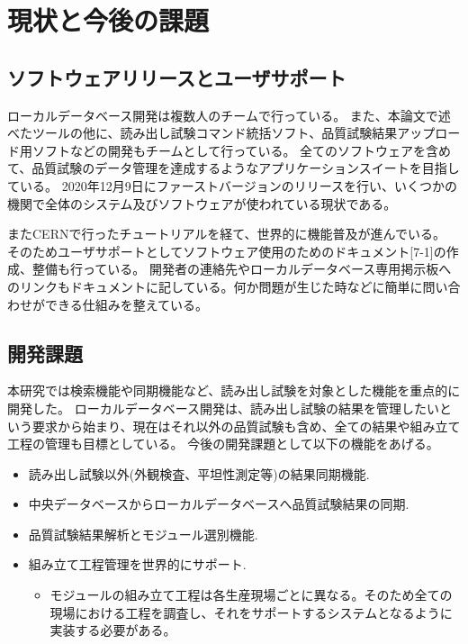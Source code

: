 \section{現状と今後の課題}
\subsection{ソフトウェアリリースとユーザサポート}
ローカルデータベース開発は複数人のチームで行っている。
また、本論文で述べたツールの他に、読み出し試験コマンド統括ソフト、品質試験結果アップロード用ソフトなどの開発もチームとして行っている。
全てのソフトウェアを含めて、品質試験のデータ管理を達成するようなアプリケーションスイートを目指している。
2020年12月9日にファーストバージョンのリリースを行い、いくつかの機関で全体のシステム及びソフトウェアが使われている現状である。

またCERNで行ったチュートリアルを経て、世界的に機能普及が進んでいる。
そのためユーザサポートとしてソフトウェア使用のためのドキュメント[7-1]の作成、整備も行っている。
開発者の連絡先やローカルデータベース専用掲示板へのリンクもドキュメントに記している。何か問題が生じた時などに簡単に問い合わせができる仕組みを整えている。

\subsection{開発課題}
本研究では検索機能や同期機能など、読み出し試験を対象とした機能を重点的に開発した。
ローカルデータベース開発は、読み出し試験の結果を管理したいという要求から始まり、現在はそれ以外の品質試験も含め、全ての結果や組み立て工程の管理も目標としている。
今後の開発課題として以下の機能をあげる。
\begin{itemize}
  \item 読み出し試験以外(外観検査、平坦性測定等)の結果同期機能.
  \item 中央データベースからローカルデータベースへ品質試験結果の同期.
  \item 品質試験結果解析とモジュール選別機能. 
  \item 組み立て工程管理を世界的にサポート.
  \begin{itemize}
    \item モジュールの組み立て工程は各生産現場ごとに異なる。そのため全ての現場における工程を調査し、それをサポートするシステムとなるように実装する必要がある。
  \end{itemize}
\end{itemize}


